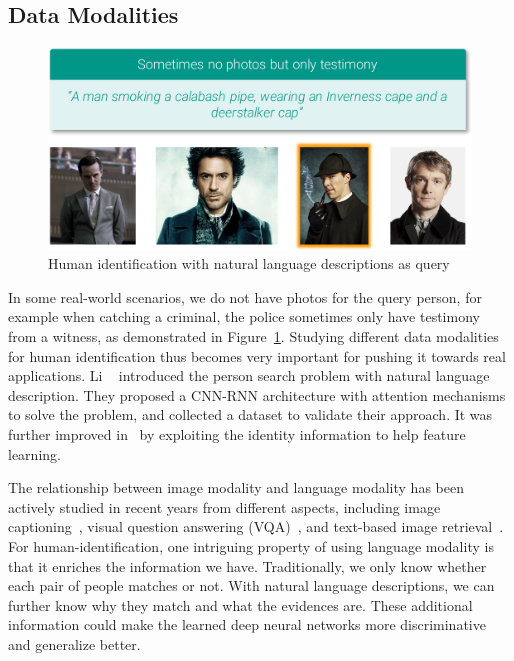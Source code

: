 {\color{red}\subsection{Data Modalities} %
\label{sub:human-id-data-modalities}
\begin{figure}[t]
\begin{center}
\includegraphics[width=1.0\linewidth]{figures/text-based-reid.pdf}
\caption{Human identification with natural language descriptions as query}
\label{fig:human-id-text-based-reid}
\end{center}
\end{figure}
In some real-world scenarios, we do not have photos for the query person, for example when catching a criminal, the police sometimes only have testimony from a witness, as demonstrated in Figure~\ref{fig:human-id-text-based-reid}. Studying different data modalities for human identification thus becomes very important for pushing it towards real applications. Li \etal~\cite{li2017person} introduced the person search problem with natural language description. They proposed a CNN-RNN architecture with attention mechanisms to solve the problem, and collected a dataset to validate their approach. It was further improved in~\cite{li2017identity} by exploiting the identity information to help feature learning.

The relationship between image modality and language modality has been actively studied in recent years from different aspects, including image captioning~\cite{karpathy2015deep,xu2015show,vinyals2015show,johnson2016densecap}, visual question answering (VQA)~\cite{antol2015vqa,ren2015exploring,malinowski2015ask,johnson2016clevr}, and text-based image retrieval~\cite{reed2016learning}. For human-identification, one intriguing property of using language modality is that it enriches the information we have. Traditionally, we only know whether each pair of people matches or not. With natural language descriptions, we can further know why they match and what the evidences are. These additional information could make the learned deep neural networks more discriminative and generalize better.

}
